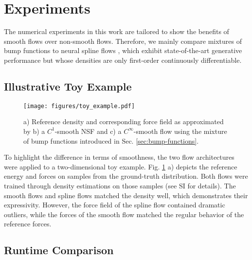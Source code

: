 \documentclass{article}
\newcommand{\jonas}[1]{{\color{red} \textbf{jonas:} #1}}
\begin{document}


\section{Experiments}
The numerical experiments in this work are tailored to show the benefits of smooth flows over non-smooth flows. Therefore, we mainly compare mixtures of bump functions to neural spline flows \cite{durkan2019neural}, which exhibit state-of-the-art generative performance but whose densities are only first-order continuously differentiable.

\subsection{Illustrative Toy Example}
\begin{figure}[htbp]
    \centering
    \texttt{[image: figures/toy\_example.pdf]}
    \caption{a) Reference density and corresponding force field as approximated by b) a $C^{1}$-smooth NSF and c) a $C^{\infty}$-smooth flow using the mixture of bump functions introduced in Sec. \ref{sec:bump-functions}.}
    \label{fig:toy}
\end{figure}
To highlight the difference in terms of smoothness, the two flow architectures were applied to a two-dimensional toy example. Fig. \ref{fig:toy} a) depicts the reference energy and forces on samples from the ground-truth distribution. Both flows were trained through density estimations on those samples (see SI for details). The smooth flows and spline flows matched the density well, which demonstrates their expressivity. However, the force field of the spline flow contained dramatic outliers, while the forces of the smooth flow matched the regular behavior of the reference forces.


\subsection{Runtime Comparison}
\end{document}
